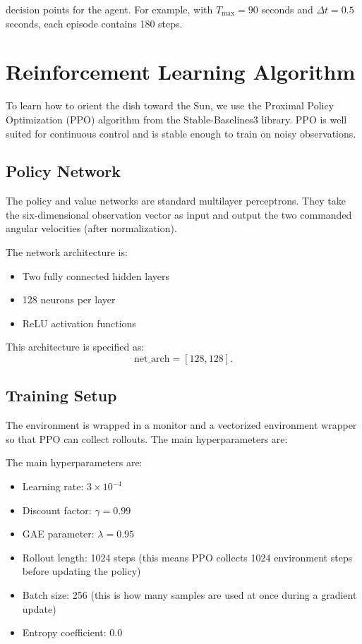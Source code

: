 \documentclass[11pt,a4paper]{article}
\begin{document}
decision points for the agent.  
For example, with $T_{\max} = 90$ seconds and $\Delta t = 0.5$ seconds, each episode contains 180 steps.

\section{Reinforcement Learning Algorithm}

To learn how to orient the dish toward the Sun, we use the Proximal Policy Optimization (PPO) algorithm from the Stable-Baselines3 library.  
PPO is well suited for continuous control and is stable enough to train on noisy observations.

\subsection{Policy Network}

The policy and value networks are standard multilayer perceptrons.  
They take the six-dimensional observation vector as input and output the two commanded angular velocities (after normalization).

The network architecture is:

\begin{itemize}
    \item Two fully connected hidden layers
    \item 128 neurons per layer
    \item ReLU activation functions
\end{itemize}

This architecture is specified as:
\begin{equation}
\text{net\_arch} = [128, 128].
\end{equation}

\subsection{Training Setup}

The environment is wrapped in a monitor and a vectorized environment wrapper so that PPO can collect rollouts.  
The main hyperparameters are:

The main hyperparameters are:

\begin{itemize}
    \item Learning rate: $3 \times 10^{-4}$
    \item Discount factor: $\gamma = 0.99$
    \item GAE parameter: $\lambda = 0.95$
    \item Rollout length: 1024 steps (this means PPO collects 1024 environment steps before updating the policy)
    \item Batch size: 256 (this is how many samples are used at once during a gradient update)
    \item Entropy coefficient: 0.0
\end{itemize}
\end{document}

